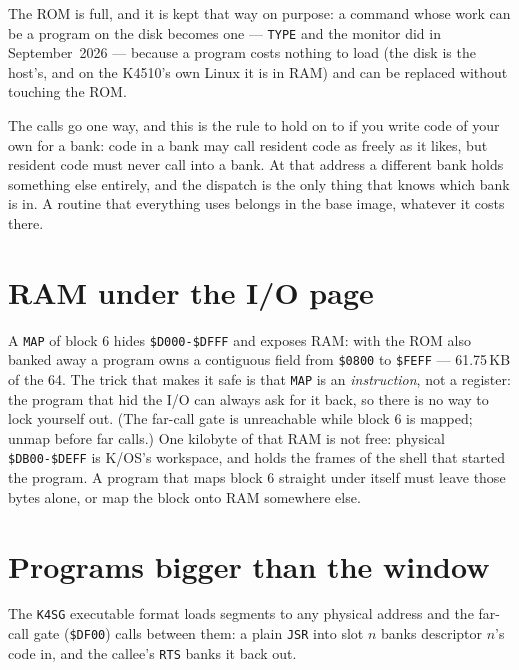 The ROM is full, and it is kept that way on purpose: a command whose
work can be a program on the disk becomes one --- \verb|TYPE| and the
monitor did in September~2026 --- because a program costs nothing to
load (the disk is the host's, and on the K4510's own Linux it is in RAM)
and can be replaced without touching the ROM.

The calls go one way, and this is the rule to hold on to if you write
code of your own for a bank: code in a bank may call resident code as
freely as it likes, but resident code must never call into a bank. At
that address a different bank holds something else entirely, and the
dispatch is the only thing that knows which bank is in. A routine that
everything uses belongs in the base image, whatever it costs there.

\section{RAM under the I/O page}
A \texttt{MAP} of block 6 hides \texttt{\$D000-\$DFFF} and exposes RAM:
with the ROM also banked away a program owns a contiguous field from
\texttt{\$0800} to \texttt{\$FEFF} --- 61.75\,KB of the 64. The trick
that makes it safe is that \texttt{MAP} is an \emph{instruction}, not a
register: the program that hid the I/O can always ask for it back, so
there is no way to lock yourself out. (The far-call gate is unreachable
while block 6 is mapped; unmap before far calls.) One kilobyte of that
RAM is not free: physical \texttt{\$DB00-\$DEFF} is K/OS's workspace,
and holds the frames of the shell that started the program. A program
that maps block 6 straight under itself must leave those bytes alone,
or map the block onto RAM somewhere else.

\section{Programs bigger than the window}
The \texttt{K4SG} executable format loads segments to any physical address
and the far-call gate (\verb|$DF00|) calls between them: a plain \verb|JSR|
into slot $n$ banks descriptor $n$'s code in, and the callee's \verb|RTS|
banks it back out.
